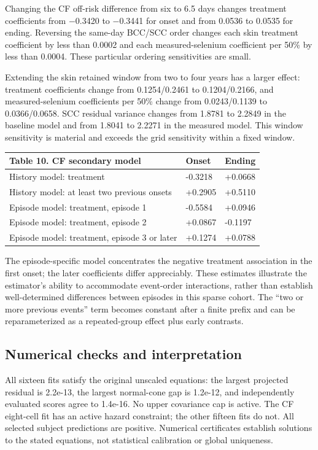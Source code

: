 \documentclass[11pt]{article}
\begin{document}
Changing the CF off-risk difference from six to 6.5 days changes treatment coefficients from $-$0.3420 to $-$0.3441 for onset and from 0.0536 to 0.0535 for ending. Reversing the same-day BCC/SCC order changes each skin treatment coefficient by less than 0.0002 and each measured-selenium coefficient per 50\% by less than 0.0004. These particular ordering sensitivities are small.

Extending the skin retained window from two to four years has a larger effect: treatment coefficients change from 0.1254/0.2461 to 0.1204/0.2166, and measured-selenium coefficients per 50\% change from 0.0243/0.1139 to 0.0366/0.0658. SCC residual variance changes from 1.8781 to 2.2849 in the baseline model and from 1.8041 to 2.2271 in the measured model. This window sensitivity is material and exceeds the grid sensitivity within a fixed window.

\label{tab:10}
{
\begin{longtable}{lll}
\toprule
\textbf{Table 10. CF secondary model} & \textbf{Onset} & \textbf{Ending} \\
\midrule
\endhead
\bottomrule
\endlastfoot
History model: treatment & -0.3218 & +0.0668 \\
History model: at least two previous onsets & +0.2905 & +0.5110 \\
Episode model: treatment, episode 1 & -0.5584 & +0.0946 \\
Episode model: treatment, episode 2 & +0.0867 & -0.1197 \\
Episode model: treatment, episode 3 or later & +0.1274 & +0.0788 \\
\end{longtable}}

The episode-specific model concentrates the negative treatment association in the first onset; the later coefficients differ appreciably. These estimates illustrate the estimator's ability to accommodate event-order interactions, rather than establish well-determined differences between episodes in this sparse cohort. The ``two or more previous events'' term becomes constant after a finite prefix and can be reparameterized as a repeated-group effect plus early contrasts.

\subsection{Numerical checks and interpretation}\label{sec:7.4}

All sixteen fits satisfy the original unscaled equations: the largest projected residual is 2.2e-13, the largest normal-cone gap is 1.2e-12, and independently evaluated scores agree to 1.4e-16. No upper covariance cap is active. The CF eight-cell fit has an active hazard constraint; the other fifteen fits do not. All selected subject predictions are positive. Numerical certificates establish solutions to the stated equations, not statistical calibration or global uniqueness.
\end{document}

